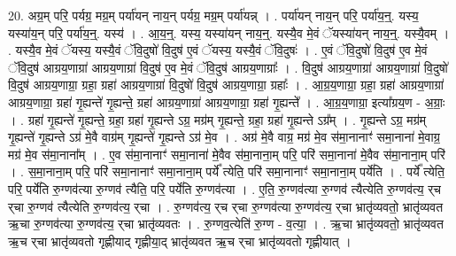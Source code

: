 \documentclass[17pt]{extarticle}
\begin{document}
20. अग्र॒म् परि॒ पर्यग्र॒ मग्र॒म् पर्या॑यन् नाय॒न् पर्यग्र॒ मग्र॒म् पर्या॑यन्न् । . पर्या॑यन् नाय॒न् परि॒ पर्या॑य॒न्॒. यस्य॒ यस्या॑य॒न् परि॒ पर्या॑य॒न्॒. यस्य॑ । . आ॒य॒न्॒. यस्य॒ यस्या॑यन् नाय॒न्॒. यस्यै॒व मे॒वं ॅयस्या॑यन् नाय॒न्॒. यस्यै॒वम् । . यस्यै॒व मे॒वं ॅयस्य॒ यस्यै॒वं ॅवि॒दुषो॑ वि॒दुष॑ ए॒वं ॅयस्य॒ यस्यै॒वं ॅवि॒दुषः॑ । . ए॒वं ॅवि॒दुषो॑ वि॒दुष॑ ए॒व मे॒वं ॅवि॒दुष॑ आग्रय॒णाग्रा॑ आग्रय॒णाग्रा॑ वि॒दुष॑ ए॒व मे॒वं ॅवि॒दुष॑ आग्रय॒णाग्राः᳚ । . वि॒दुष॑ आग्रय॒णाग्रा॑ आग्रय॒णाग्रा॑ वि॒दुषो॑ वि॒दुष॑ आग्रय॒णाग्रा॒ ग्रहा॒ ग्रहा॑ आग्रय॒णाग्रा॑ वि॒दुषो॑ वि॒दुष॑ आग्रय॒णाग्रा॒ ग्रहाः᳚ । . आ॒ग्र॒य॒णाग्रा॒ ग्रहा॒ ग्रहा॑ आग्रय॒णाग्रा॑ आग्रय॒णाग्रा॒ ग्रहा॑ गृ॒ह्यन्ते॑ गृ॒ह्यन्ते॒ ग्रहा॑ आग्रय॒णाग्रा॑ आग्रय॒णाग्रा॒ ग्रहा॑ गृ॒ह्यन्ते᳚ । . आ॒ग्र॒य॒णाग्रा॒ इत्या᳚ग्रय॒ण - अ॒ग्राः॒ । . ग्रहा॑ गृ॒ह्यन्ते॑ गृ॒ह्यन्ते॒ ग्रहा॒ ग्रहा॑ गृ॒ह्यन्ते ऽग्र॒ मग्र॑म् गृ॒ह्यन्ते॒ ग्रहा॒ ग्रहा॑ गृ॒ह्यन्ते ऽग्र᳚म् । . गृ॒ह्यन्ते ऽग्र॒ मग्र॑म् गृ॒ह्यन्ते॑ गृ॒ह्यन्ते ऽग्र॑ मे॒वै वाग्र॑म् गृ॒ह्यन्ते॑ गृ॒ह्यन्ते ऽग्र॑ मे॒व । . अग्र॑ मे॒वै वाग्र॒ मग्र॑ मे॒व स॑मा॒नानाꣳ॑ समा॒नाना॑ मे॒वाग्र॒ मग्र॑ मे॒व स॑मा॒नाना᳚म् । . ए॒व स॑मा॒नानाꣳ॑ समा॒नाना॑ मे॒वैव स॑मा॒नाना॒म् परि॒ परि॑ समा॒नाना॑ मे॒वैव स॑मा॒नाना॒म् परि॑ । . स॒मा॒नाना॒म् परि॒ परि॑ समा॒नानाꣳ॑ समा॒नाना॒म् पर्ये᳚ त्येति॒ परि॑ समा॒नानाꣳ॑ समा॒नाना॒म् पर्ये॑ति । . पर्ये᳚ त्येति॒ परि॒ पर्ये॑ति रु॒ग्णव॑त्या रु॒ग्णव॑ त्यैति॒ परि॒ पर्ये॑ति रु॒ग्णव॑त्या । . ए॒ति॒ रु॒ग्णव॑त्या रु॒ग्णव॑ त्यैत्येति रु॒ग्णव॑त्य॒ र्‌च र्‌चा रु॒ग्णव॑ त्यैत्येति रु॒ग्णव॑त्य॒ र्‌चा । . रु॒ग्णव॑त्य॒ र्‌च र्‌चा रु॒ग्णव॑त्या रु॒ग्णव॑त्य॒ र्‌चा भ्रातृ॑व्यवतो॒ भ्रातृ॑व्यवत ऋ॒चा रु॒ग्णव॑त्या रु॒ग्णव॑त्य॒ र्‌चा भ्रातृ॑व्यवतः । . रु॒ग्णव॒त्येति॑ रु॒ग्ण - व॒त्या॒ । . ऋ॒चा भ्रातृ॑व्यवतो॒ भ्रातृ॑व्यवत ऋ॒च र्‌चा भ्रातृ॑व्यवतो गृह्णीयाद् गृह्णीया॒द् भ्रातृ॑व्यवत ऋ॒च र्‌चा भ्रातृ॑व्यवतो गृह्णीयात् । \newline
\end{document}
